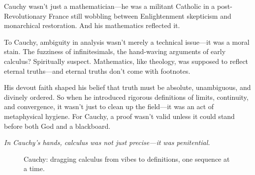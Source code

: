 \begin{tcolorbox}[
  colback=gray!5,
  colframe=black,
  title=\textbf{Historical Sidebar: Cauchy’s Catholic Calculus},
  fonttitle=\bfseries,
  width=\linewidth,
  enlarge left by=0mm,
  enlarge right by=0mm,
  boxrule=0.4pt,
  arc=2mm,
  left=4pt,
  right=4pt,
  top=6pt,
  bottom=6pt
]
Cauchy wasn’t just a mathematician—he was a militant Catholic in a post-Revolutionary France still wobbling between Enlightenment skepticism and monarchical restoration. And his mathematics reflected it.

\medskip

To Cauchy, ambiguity in analysis wasn’t merely a technical issue—it was a moral stain. The fuzziness of infinitesimals, the hand-waving arguments of early calculus? Spiritually suspect. Mathematics, like theology, was supposed to reflect eternal truths—and eternal truths don’t come with footnotes.

\medskip

His devout faith shaped his belief that truth must be absolute, unambiguous, and divinely ordered. So when he introduced rigorous definitions of limits, continuity, and convergence, it wasn’t just to clean up the field—it was an act of metaphysical hygiene. For Cauchy, a proof wasn’t valid unless it could stand before both God and a blackboard.

\medskip

\begin{center}
\emph{In Cauchy’s hands, calculus was not just precise—it was penitential.}
\end{center}
\end{tcolorbox}


\begin{figure}[H]
\centering
{}
\caption{Cauchy: dragging calculus from vibes to definitions, one sequence at a time.}
\end{figure}


